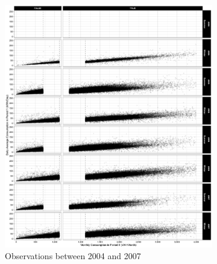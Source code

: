 \begin{figure}
    \begin{subfigure}{1.0\textwidth}
        \centering
        \includegraphics[scale = 0.12]{02_Plots/SMUD-Billing-Data_RD-Design_Scatter_Absolute-Consumption-in-H-Axis_RSCH_2004-2007}
        \caption{Observations between 2004 and 2007}
    \end{subfigure}
    \newline
    \begin{subfigure}{1.0\textwidth}
        \centering

\end{subfigure}
\end{figure}

